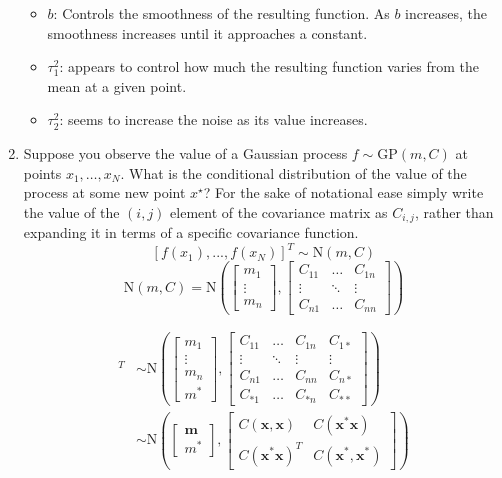 \documentclass[10pt]{article}
\begin{document}
\begin{enumerate}[label=(\Alph*)]
        \begin{itemize}
            \item $b$: Controls the smoothness of the resulting function. As $b$ increases, the smoothness increases until it approaches a constant.

            \item $\tau_1^2$: appears to control how much the resulting function varies from the mean at a given point.

            \item $\tau_2^2$: seems to increase the noise as its value increases.
        \end{itemize}

        \clearpage
        \item Suppose you observe the value of a Gaussian process $f \sim \mbox{GP}(m,C)$ at points $x_1, \ldots, x_N$.  What is the conditional distribution of the value of the process at some new point $x^{\star}$?  For the sake of notational ease simply write the value of the $(i,j)$ element of the covariance matrix as $C_{i,j}$, rather than expanding it in terms of a specific covariance function.\\

        $$[f(x_1), ... , f(x_N)]^T \sim \text{N}(m, C)$$
        $$\text{N}(m, C) = \text{N} \left( \begin{bmatrix}m_1 \\ \vdots \\ m_n\end{bmatrix}, \begin{bmatrix}C_{11} & \dots & C_{1n} \\ \vdots & \ddots & \vdots \\ C_{n1} & \dots & C_{nn}\end{bmatrix}\right)$$

        \begin{align*}
            [f(x_1), ... , f(x_N), f(x^*)]^T &\sim \text{N} \left( \begin{bmatrix}m_1 \\ \vdots \\ m_n \\ m^*\end{bmatrix}, \begin{bmatrix}C_{11} & \dots & C_{1n} & C_{1 *}\\ \vdots & \ddots & \vdots & \vdots \\ C_{n1} & \dots & C_{nn} & C_{n*} \\ C_{*1} & \dots & C_{*n} & C_{**} \end{bmatrix}\right) \\
            & \sim \text{N} \left ( \begin{bmatrix} \mathbf{m} \\ m^*\end{bmatrix}, \begin{bmatrix} C(\mathbf{x, x}) & C(\mathbf{x^*x}) \\ C(\mathbf{x^*x})^T & C(\mathbf{x^*, x^*})\end{bmatrix}\right)
        \end{align*}


\end{enumerate}
\end{document}
